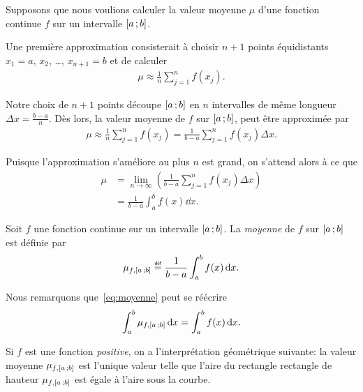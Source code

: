 \documentclass[main.tex]{subfiles}
\begin{document}
Supposons que nous voulions calculer la valeur moyenne $\mu$ d'une fonction continue $f$ sur un intervalle $\mathopen{[}a\,;b\mathclose{]}$.

Une première approximation consisterait à choisir $n + 1$ points équidistants $x_1 = a$, $x_2$, \dots, $x_{n + 1} = b$
et de calculer
\begin{align}
    \mu \approx \frac 1 n \sum_{j = 1}^n f(x_j).
\end{align}

Notre choix de $n + 1$ points découpe $\mathopen{[}a\,;b\mathclose{]}$ en $n$ intervalles de même longueur $\Delta x = \frac {b - a} n$.
Dès lors,
la valeur moyenne de $f$ sur $\mathopen{[}a\,;b\mathclose{]}$,
peut être approximée par
\begin{align}
    \mu \approx \frac 1 n \sum_{j = 1}^n f(x_j)
    = \frac 1 {b - a} \sum_{j = 1}^n f(x_j) \Delta x.
\end{align}

Puisque l'approximation s'améliore au plus $n$ est grand,
on s'attend alors à ce que
\begin{align}
    \mu &= \lim_{n \to \infty} \left(\frac 1 {b - a} \sum_{j = 1}^n f(x_j) \Delta x\right)\\
        &= \frac 1 {b - a} \int_a^b f(x) \dd x.
\end{align}

\begin{definition}

    Soit $f$ une fonction continue sur un intervalle $\mathopen{[}a\,;b\mathclose{]}$.
    La \emph{moyenne} de $f$ sur $\mathopen{[}a\,;b\mathclose{]}$ est définie par
    \begin{align}
        \mu_{f, \ccinterval a b} \defeq \frac 1 {b - a} \int_a^b f(x) \dd x.
        \label{eq:moyenne}
    \end{align}
\end{definition}

\begin{remark}
    Nous remarquons que~\eqref{eq:moyenne} peut se réécrire
    \begin{align*}
        \int_a^b \mu_{f, \mathopen{[}a\,;b\mathclose{]}} \,\mathrm{d} x = \int_a^b f(x) \,\mathrm{d} x.
    \end{align*}

    Si $f$ est une fonction \emph{positive},
    on a l'interprétation géométrique suivante:
    la valeur moyenne $\mu_{f, \mathopen{[}a\,;b\mathclose{]}}$ est l'unique valeur telle que
    l'aire du rectangle rectangle de hauteur $\mu_{f, \mathopen{[}a\,;b\mathclose{]}}$
    est égale à l'aire sous la courbe.
    \begin{plot}{0.5}{-1}{-1}{4}{4}
    \end{plot}
\end{remark}
\end{document}
